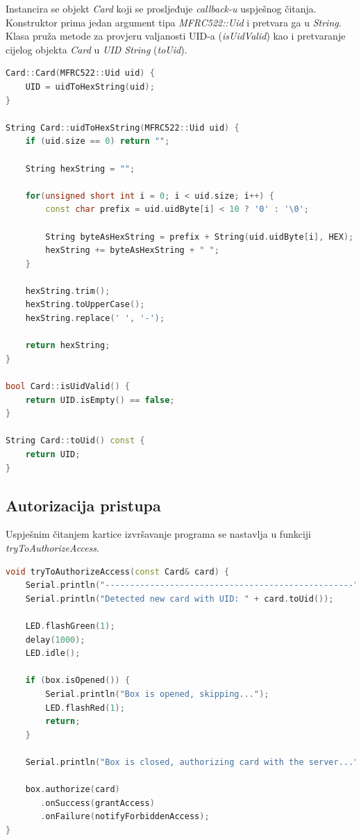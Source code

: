 Instancira se objekt \textit{Card} koji se prosljeđuje \textit{callback-u} uspješnog čitanja.
Konstruktor prima jedan argument tipa \textit{MFRC522::Uid} i pretvara ga u \textit{String}.
Klasa pruža metode za provjeru valjanosti UID-a (\textit{isUidValid}) kao i pretvaranje cijelog objekta \textit{Card} u
\textit{UID String} (\textit{toUid}).

\begin{lstlisting}[language=C++]
Card::Card(MFRC522::Uid uid) {
    UID = uidToHexString(uid);
}

String Card::uidToHexString(MFRC522::Uid uid) {
    if (uid.size == 0) return "";

    String hexString = "";

    for(unsigned short int i = 0; i < uid.size; i++) {
        const char prefix = uid.uidByte[i] < 10 ? '0' : '\0';

        String byteAsHexString = prefix + String(uid.uidByte[i], HEX);
        hexString += byteAsHexString + " ";
    }

    hexString.trim();
    hexString.toUpperCase();
    hexString.replace(' ', '-');

    return hexString;
}

bool Card::isUidValid() {
    return UID.isEmpty() == false;
}

String Card::toUid() const {
    return UID;
}
\end{lstlisting}

\subsection{Autorizacija pristupa}

Uspješnim čitanjem kartice izvršavanje programa se nastavlja u funkciji \textit{tryToAuthorizeAccess}.

\begin{lstlisting}[language=C++]
void tryToAuthorizeAccess(const Card& card) {
    Serial.println("--------------------------------------------------");
    Serial.println("Detected new card with UID: " + card.toUid());

    LED.flashGreen(1);
    delay(1000);
    LED.idle();

    if (box.isOpened()) {
        Serial.println("Box is opened, skipping...");
        LED.flashRed(1);
        return;
    }

    Serial.println("Box is closed, authorizing card with the server...");

    box.authorize(card)
       .onSuccess(grantAccess)
       .onFailure(notifyForbiddenAccess);
}
\end{lstlisting}

